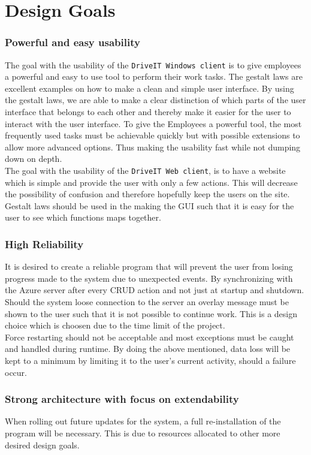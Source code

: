 \section{Design Goals}
\subsubsection{Powerful and easy usability}
The goal with the usability of the \texttt{DriveIT Windows client} is to give employees a powerful and easy to use tool to perform their work tasks. The gestalt laws are excellent examples on how to make a clean and simple user interface. By using the gestalt laws, we are able to make a clear distinction of which parts of the user interface that belongs to each other and thereby make it easier for the user to interact with the user interface. To give the Employees a powerful tool, the most frequently used tasks must be achievable quickly but with possible extensions to allow more advanced options. Thus making the usability fast while not dumping down on depth.\\

The goal with the usability of the \texttt{DriveIT Web client}, is to have a website which is simple and provide the user with only a few actions. This will decrease the possibility of confusion and therefore hopefully keep the users on the site. Gestalt laws should be used in the making the GUI such that it is easy for the user to see which functions maps together.

\subsubsection{High Reliability}
It is desired to create a reliable program that will prevent the user from losing progress made to the system due to unexpected events. By synchronizing with the Azure server after every CRUD action and not just at startup and shutdown. Should the system loose connection to the server an overlay message must be shown to the user such that it is not possible to continue work. This is a design choice which is choosen due to the time limit of the project. \\
Force restarting should not be acceptable and most exceptions must be caught and handled during runtime. By doing the above mentioned, data loss will be kept to a minimum by limiting it to the user's current activity, should a failure occur.

\subsubsection{Strong architecture with focus on extendability}
When rolling out future updates for the system, a full re-installation of the program will be necessary. This is due to resources allocated to other more desired design goals.\\

